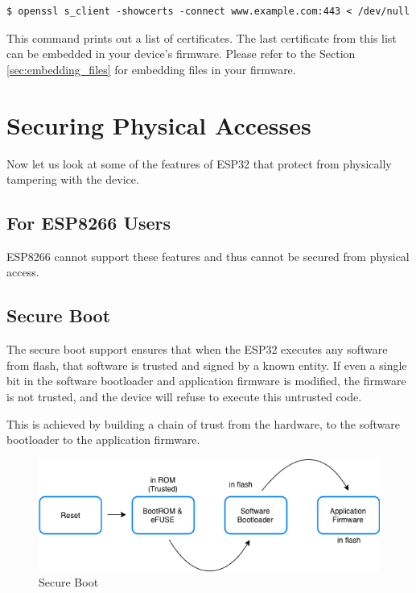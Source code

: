 \documentclass[main.tex]{subfiles}
\begin{document}
\begin{verbatim}
$ openssl s_client -showcerts -connect www.example.com:443 < /dev/null
\end{verbatim}

This command prints out a list of certificates. The last certificate from this list can be embedded in your device's firmware. Please refer to the Section \ref{sec:embedding_files} for embedding files in your firmware.

\section{Securing Physical Accesses}
Now let us look at some of the features of ESP32 that protect from physically tampering with the device.

\subsection{For ESP8266 Users}\label{sec:for_esp8266_users}
ESP8266 cannot support these features and thus cannot be secured from physical access.

\subsection{Secure Boot}
The secure boot support ensures that when the ESP32 executes any software from flash, that software is trusted and signed by a known entity. If even a single bit in the software bootloader and application firmware is modified, the firmware is not trusted, and the device will refuse to execute this untrusted code.

This is achieved by building a chain of trust from the hardware, to the software bootloader to the application firmware.

\begin{figure}[h!]
    \centering
    \includegraphics[scale=0.5]{../../_static/secure_boot.png}
    \caption{Secure Boot}
    \label{fig:sec_boot}
\end{figure}
\end{document}
